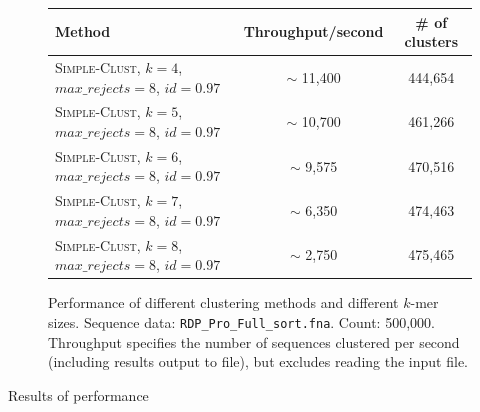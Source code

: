 \begin{figure}[H]
  \centering
  \begin{tabular}{ p{12em} | c | c }
    Method  & Throughput/second   & \# of clusters \\
    \hline \hline
    \textsc{Simple-Clust}, $k=4$,
    $max\_rejects=8$, $id=0.97$     & $\sim$ 11,400  & 444,654  \\
    \hline
    \textsc{Simple-Clust}, $k=5$,
    $max\_rejects=8$, $id=0.97$     & $\sim$ 10,700  & 461,266  \\
    \hline
    \textsc{Simple-Clust}, $k=6$,
    $max\_rejects=8$, $id=0.97$     & $\sim$ 9,575   & 470,516  \\
    \hline
    \textsc{Simple-Clust}, $k=7$,
    $max\_rejects=8$, $id=0.97$     & $\sim$ 6,350   & 474,463  \\
    \hline
    \textsc{Simple-Clust}, $k=8$,
    $max\_rejects=8$, $id=0.97$     & $\sim$ 2,750   & 475,465  \\
  \end{tabular}
  \caption{Performance of different clustering methods and different $k$-mer
  sizes. Sequence data:
           \texttt{RDP\_Pro\_Full\_sort.fna}. Count: 500,000. Throughput
           specifies the number of sequences clustered per second (including
           results output to file), but excludes reading the input file.}
\end{figure}

Results of performance

